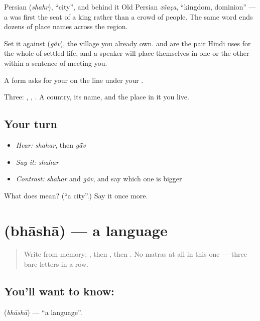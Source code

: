 Persian  (\emph{shahr}), \textquotedblleft{}city\textquotedblright{}, and behind it Old Persian \emph{xšaça}, \textquotedblleft{}kingdom, dominion\textquotedblright{} — a  was first the seat of a king rather than a crowd of people. The same word ends dozens of place names across the region.

Set it against \textbf{} (\emph{gā̃v}), the village you already own.  and  are the pair Hindi uses for the whole of settled life, and a speaker will place themselves in one or the other within a sentence of meeting you.

A form asks for your  on the line under your .

\begin{grammarlens}[title={What you've built}]
Three: , , . A country, its name, and the place in it you live.
\end{grammarlens}

\subsection*{Your turn}
\begin{itemize}
\raggedright
  \item \emph{Hear:} \emph{shahar}, then \emph{gā̃v}
  \item \emph{Say it:} \emph{shahar}
  \item \emph{Contrast:} \emph{shahar} and \emph{gā̃v}, and say which one is bigger
\end{itemize}

\begin{tcolorbox}[breakable,colback=teal!4,colframe=teal!35!black,title={Before you move on}]
What does  mean? (\textquotedblleft{}a city\textquotedblright{}.) Say it once more.
\end{tcolorbox}
\section[bhāshā]{ (bhāshā) — a language}

\label{lesson:HI-C68-language}



\begin{quote}
Write \textbf{} from memory: , then , then . No matras at all in this one — three bare letters in a row.
\end{quote}

\subsection*{You'll want to know: }
\textbf{} (\emph{bhāshā}) — \textquotedblleft{}a language\textquotedblright{}.

